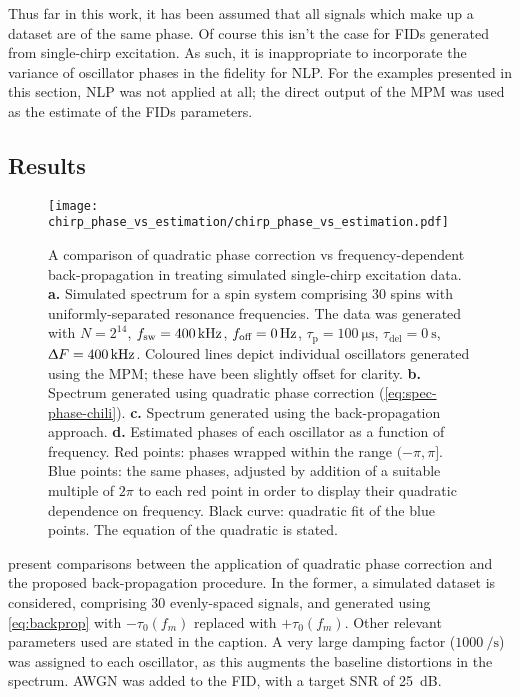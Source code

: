 Thus far in this work, it has been assumed that all signals which make up a
dataset are of the same phase. Of course this isn't the case for \acp{FID}
generated from single-chirp excitation. As such, it is inappropriate to
incorporate the variance of oscillator phases in the fidelity for \ac{NLP}.
For the examples presented in this section, \ac{NLP} was not applied at all;
the direct output of the \ac{MPM} was used as the estimate of the \acp{FID}
parameters.

\subsection{Results}
\begin{figure}
    \centering
    \texttt{[image: chirp\_phase\_vs\_estimation/chirp\_phase\_vs\_estimation.pdf]}
    \caption[
        A comparison of quadratic phase correction vs frequency-dependent
        back-propagation in treating simulated single-chirp excitation data.
    ]
    {
        A comparison of quadratic phase correction vs frequency-dependent
        back-propagation in treating simulated single-chirp excitation data.
        \textbf{a.} Simulated spectrum for a spin system comprising 30 spins
        with uniformly-separated resonance frequencies. The data was generated
        with
        $N=2^{14}$,
        $f_{\mathrm{sw}}=\qty{400}{\kilo\hertz}$,
        $f_{\text{off}}=\qty{0}{\hertz}$,
        $\tau_{\text{p}} = \qty{100}{\micro\second}$,
        $\tau_{\text{del}} = \qty{0}{\second}$,
        $\Updelta F = \qty{400}{\kilo\hertz}$.
        Coloured lines depict individual oscillators generated using the
        \ac{MPM}; these have been slightly offset for clarity.
        \textbf{b.} Spectrum generated using quadratic phase correction
        (\cref{eq:spec-phase-chili}).
        \textbf{c.} Spectrum generated using the back-propagation approach.
        \textbf{d.} Estimated phases of each oscillator as a function of
        frequency. Red points: phases wrapped within the range $(-\pi, \pi]$.
        Blue points: the same phases, adjusted by addition of a suitable multiple
        of $2 \pi$ to each red point in order to display their quadratic
        dependence on frequency.
        Black curve: quadratic fit of the blue points. The equation of the
        quadratic is stated.
    }
    \label{fig:bbqchili-sim}
\end{figure}
 present comparisons
between the application of quadratic phase correction and the proposed
back-propagation procedure. In the former, a simulated
dataset is considered, comprising 30 evenly-spaced signals, and generated using
\cref{eq:backprop} with $-\tau_0(f_m)$ replaced with $+\tau_0(f_m)$. Other
relevant parameters used are stated in the caption.
A very large damping factor ($\qty{1000}{\per\second}$) was assigned to each
oscillator, as this augments the baseline distortions in the spectrum.
\ac{AWGN} was added to the \ac{FID}, with a target \ac{SNR} of
\qty{25}{\deci\bel}.

